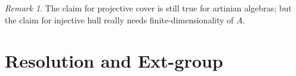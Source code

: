 \documentclass[11pt,a4paper]{article}
\makeatletter
\numberwithin{equation}{section}
\renewenvironment{proof}[1][\proofname]{\par
    \pushQED{\qed}%
    \normalfont \topsep0\p@\@plus6\p@ \labelsep1em\relax
    \trivlist
    \item[\hskip\labelsep\indent
        \bfseries #1]\ignorespaces
    \mbox{}
}{
    \popQED\endtrivlist\@endpefalse
}
\theoremstyle{all}
\newtheorem{lemma}[theorem]{Lemma}
\newtheorem{definition}[theorem]{Definition}
\theoremstyle{remark}
\newtheorem{remark}[theorem]{Remark}
\newcommand{\Hom}{\operatorname{Hom}\nolimits}
\newcommand{\End}{\operatorname{End}\nolimits}
\makeatother
\begin{document}
\begin{remark}
The claim for projective cover is still true for artinian algebras; but the claim for injective hull really needs finite-dimensionality of $A$.
\end{remark}
%
%
%
%
%



\pagebreak
\section{Resolution and Ext-group}
\end{document}

